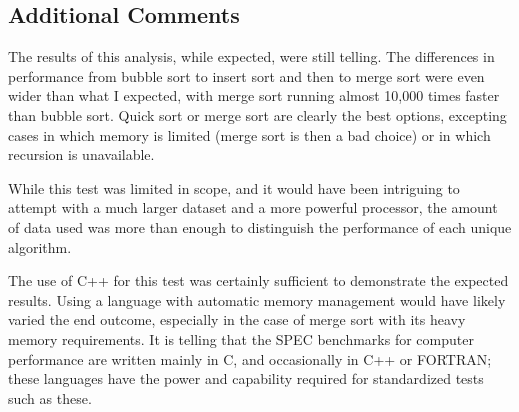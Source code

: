 \documentclass[conference]{IEEEtran}
\begin{document}
\subsection{Additional Comments}
The results of this analysis, while expected, were still telling. The differences in 
performance from bubble sort to insert sort and then to merge sort were even wider than 
what I expected, with merge sort running almost 10,000 times faster than bubble sort. 
Quick sort or merge sort are clearly the best options, excepting cases in which memory 
is limited (merge sort is then a bad choice) or in which recursion is unavailable.

While this test was limited in scope, and it would have been intriguing to attempt with 
a much larger dataset and a more powerful processor, the amount of data used was more 
than enough to distinguish the performance of each unique algorithm.

The use of C++ for this test was certainly sufficient to demonstrate the expected 
results. Using a language with automatic memory management would have likely varied the 
end outcome, especially in the case of merge sort with its heavy memory requirements. 
It is telling that the SPEC benchmarks for computer performance are written mainly in 
C, and occasionally in C++ or FORTRAN; these languages have the power and capability 
required for standardized tests such as these.
\end{document}
